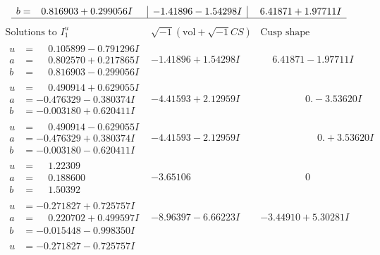 \documentclass[1p]{elsarticle_modified}
\theoremstyle{definition}
\newcommand{\I}{\sqrt{-1}}
\begin{document}
$$\begin{array}{c|c|c}
\begin{aligned}
b &= \phantom{-}0.816903 + 0.299056 I\end{aligned}
 & -1.41896 - 1.54298 I & \phantom{-}6.41871 + 1.97711 I\\
 \hline 
 \end{array}$$\newpage$$\begin{array}{c|c|c}  
\text{Solutions to }I^u_{1}& \I (\text{vol} + \sqrt{-1}CS) & \text{Cusp shape}\\
 \hline 
\begin{aligned}
u &= \phantom{-}0.105899 - 0.791296 I \\
a &= \phantom{-}0.802570 + 0.217865 I \\
b &= \phantom{-}0.816903 - 0.299056 I\end{aligned}
 & -1.41896 + 1.54298 I & \phantom{-}6.41871 - 1.97711 I \\ \hline\begin{aligned}
u &= \phantom{-}0.490914 + 0.629055 I \\
a &= -0.476329 - 0.380374 I \\
b &= -0.003180 + 0.620411 I\end{aligned}
 & -4.41593 + 2.12959 I & \phantom{-0.000000 } 0. - 3.53620 I \\ \hline\begin{aligned}
u &= \phantom{-}0.490914 - 0.629055 I \\
a &= -0.476329 + 0.380374 I \\
b &= -0.003180 - 0.620411 I\end{aligned}
 & -4.41593 - 2.12959 I & \phantom{-0.000000 -}0. + 3.53620 I \\ \hline\begin{aligned}
u &= \phantom{-}1.22309\phantom{ +0.000000I} \\
a &= \phantom{-}0.188600\phantom{ +0.000000I} \\
b &= \phantom{-}1.50392\phantom{ +0.000000I}\end{aligned}
 & -3.65106\phantom{ +0.000000I} & \phantom{-0.000000 } 0 \\ \hline\begin{aligned}
u &= -0.271827 + 0.725757 I \\
a &= \phantom{-}0.220702 + 0.499597 I \\
b &= -0.015448 - 0.998350 I\end{aligned}
 & -8.96397 - 6.66223 I & -3.44910 + 5.30281 I \\ \hline\begin{aligned}
u &= -0.271827 - 0.725757 I \\

\end{aligned}
\end{array}$$
\end{document}
